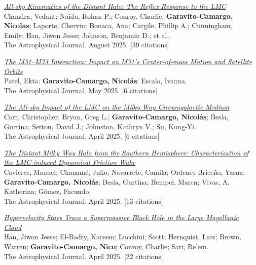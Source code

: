 \documentclass[14pt]{article}
\begin{document}
\begin{etaremune}
\item \textit{\href{https://ui.adsabs.harvard.edu/abs/2025ApJ...988..156C/abstract}{All-sky Kinematics of the Distant Halo: The Reflex Response to the LMC}}\\
  {\small \color{darkgray} Chandra, Vedant; Naidu, Rohan P.; Conroy, Charlie; \textbf{Garavito-Camargo, Nicolas}; Laporte, Chervin; Bonaca, Ana; Cargile, Phillip A.; Cunningham, Emily; Han, Jiwon Jesse; Johnson, Benjamin D.; et al..\\
  The Astrophysical Journal, August 2025. [39 citations]}

\item \textit{\href{https://ui.adsabs.harvard.edu/abs/2025ApJ...985..121P/abstract}{The M31--M33 Interaction: Impact on M31's Center-of-mass Motion and Satellite Orbits}}\\
  {\small \color{darkgray} Patel, Ekta; \textbf{Garavito-Camargo, Nicolás}; Escala, Ivanna.\\
  The Astrophysical Journal, May 2025. [6 citations]}

\item \textit{\href{https://ui.adsabs.harvard.edu/abs/2025ApJ...983..151C/abstract}{The All-sky Impact of the LMC on the Milky Way Circumgalactic Medium}}\\
  {\small \color{darkgray} Carr, Christopher; Bryan, Greg L.; \textbf{Garavito-Camargo, Nicolás}; Besla, Gurtina; Setton, David J.; Johnston, Kathryn V.; Su, Kung-Yi.\\
  The Astrophysical Journal, April 2025. [6 citations]}

\item \textit{\href{https://ui.adsabs.harvard.edu/abs/2025ApJ...983...83C/abstract}{The Distant Milky Way Halo from the Southern Hemisphere: Characterization of the LMC-induced Dynamical Friction Wake}}\\
  {\small \color{darkgray} Cavieres, Manuel; Chanamé, Julio; Navarrete, Camila; Ordenes-Briceño, Yasna; \textbf{Garavito-Camargo, Nicolás}; Besla, Gurtina; Hempel, Maren; Vivas, A. Katherina; Gómez, Facundo.\\
  The Astrophysical Journal, April 2025. [13 citations]}

\item \textit{\href{https://ui.adsabs.harvard.edu/abs/2025ApJ...982..188H/abstract}{Hypervelocity Stars Trace a Supermassive Black Hole in the Large Magellanic Cloud}}\\
  {\small \color{darkgray} Han, Jiwon Jesse; El-Badry, Kareem; Lucchini, Scott; Hernquist, Lars; Brown, Warren; \textbf{Garavito-Camargo, Nico}; Conroy, Charlie; Sari, Re'em.\\
  The Astrophysical Journal, April 2025. [22 citations]}


\end{etaremune}
\end{document}
